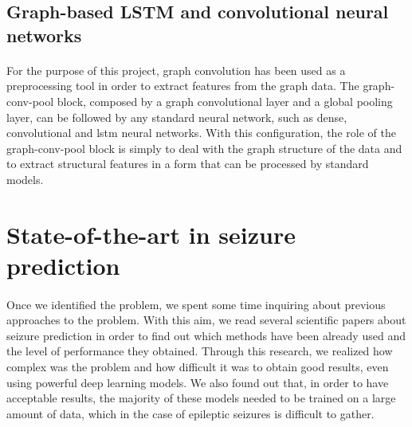 \subsection{Graph-based LSTM and convolutional neural networks}
\paragraph{} For the purpose of this project, graph convolution has been used as a preprocessing tool in order to extract features from the graph data. The graph-conv-pool block, composed by a graph convolutional layer and a global pooling layer, can be followed by any standard neural network, such as dense, convolutional and \acs{lstm} neural networks. With this configuration, the role of the graph-conv-pool block is simply to deal with the graph structure of the data and to extract structural features in a form that can be processed by standard models.

\section{State-of-the-art in seizure prediction}

\paragraph{} Once we identified the problem, we spent some time inquiring about previous approaches to the problem. With this aim, we read several scientific papers about seizure prediction in order to find out which methods have been already used and the level of performance they obtained. Through this research, we realized how complex was the problem and how difficult it was to obtain good results, even using powerful deep learning models. We also found out that, in order to have acceptable results, the majority of these models needed to be trained on a large amount of data, which in the case of epileptic seizures is difficult to gather.